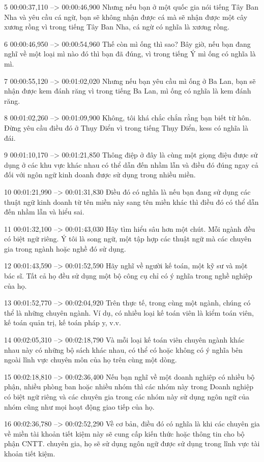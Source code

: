 5
00:00:37,110 --> 00:00:46,900
Nhưng nếu bạn ở một quốc gia nói tiếng Tây Ban Nha và yêu cầu cá ngừ, bạn sẽ không nhận được cá mà sẽ nhận được một cây xương rồng vì trong tiếng Tây Ban Nha, cá ngừ có nghĩa là xương rồng.

6
00:00:46,950 --> 00:00:54,960
Thế còn mì ống thì sao?  Bây giờ, nếu bạn đang nghĩ về một loại mì nào đó thì bạn đã đúng, vì trong tiếng Ý mì ống có nghĩa là mì.

7
00:00:55,120 --> 00:01:02,020
Nhưng nếu bạn yêu cầu mì ống ở Ba Lan, bạn sẽ nhận được kem đánh răng vì trong tiếng Ba Lan, mì ống có nghĩa là kem đánh răng.

8
00:01:02,260 --> 00:01:09,900
Không, tôi khá chắc chắn rằng bạn biết từ hôn.  Đừng yêu cầu điều đó ở Thụy Điển vì trong tiếng Thụy Điển, kess có nghĩa là đái.

9
00:01:10,170 --> 00:01:21,850
Thông điệp ở đây là cùng một giọng điệu được sử dụng ở các khu vực khác nhau có thể dẫn đến nhầm lẫn và điều đó đúng ngay cả đối với ngôn ngữ kinh doanh được sử dụng trong nhiều miền.

10
00:01:21,990 --> 00:01:31,830
Điều đó có nghĩa là nếu bạn đang sử dụng các thuật ngữ kinh doanh từ tên miền này sang tên miền khác thì điều đó có thể dẫn đến nhầm lẫn và hiểu sai.

11
00:01:32,100 --> 00:01:43,030
Hãy tìm hiểu sâu hơn một chút.  Mỗi ngành đều có biệt ngữ riêng.  Ý tôi là song ngữ, một tập hợp các thuật ngữ mà các chuyên gia trong ngành hoặc nghề đó sử dụng.

12
00:01:43,590 --> 00:01:52,590
Hãy nghĩ về người kế toán, một kỹ sư và một bác sĩ.  Tất cả họ đều sử dụng một bộ công cụ chỉ có ý nghĩa trong nghề nghiệp của họ.

13
00:01:52,770 --> 00:02:04,920
Trên thực tế, trong cùng một ngành, chúng có thể là những chuyên ngành.  Ví dụ, có nhiều loại kế toán viên là kiểm toán viên, kế toán quản trị, kế toán pháp y, v.v.

14
00:02:05,310 --> 00:02:18,790
Và mỗi loại kế toán viên chuyên ngành khác nhau này có những bộ sách khác nhau, có thể có hoặc không có ý nghĩa bên ngoài lĩnh vực chuyên môn của họ trên cùng một dòng.

15
00:02:18,810 --> 00:02:36,400
Nếu bạn nghĩ về một doanh nghiệp có nhiều bộ phận, nhiều phòng ban hoặc nhiều nhóm thì các nhóm này trong Doanh nghiệp có biệt ngữ riêng và các chuyên gia trong các nhóm này sử dụng ngôn ngữ của nhóm cũng như mọi hoạt động giao tiếp của họ.

16
00:02:36,780 --> 00:02:52,290
Về cơ bản, điều đó có nghĩa là khi các chuyên gia về miền tài khoản tiết kiệm này sẽ cung cấp kiến ​​thức hoặc thông tin cho bộ phận CNTT.  chuyên gia, họ sẽ sử dụng ngôn ngữ được sử dụng trong lĩnh vực tài khoản tiết kiệm.

